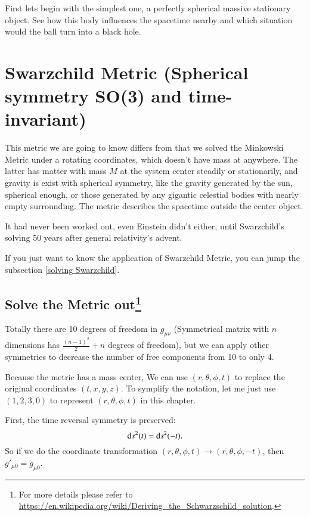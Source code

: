 \documentclass[openany,10pt]{book}
\theoremstyle{definition}
\theoremstyle{definition}
\theoremstyle{remark}
\begin{document}
First lets begin with the simplest one, a perfectly spherical massive stationary object. See how this body influences the spacetime nearby and which situation would the ball turn into a black hole.

\section{Swarzchild Metric (Spherical symmetry SO(3) and time-invariant)}

This metric we are going to know differs from that we solved the Minkowski Metric under a rotating coordinates, which doesn't have mass at anywhere. The latter has matter with mass $M$ at the system center steadily or stationarily, and gravity is exist with spherical symmetry, like the gravity generated by the sun, spherical enough, or those generated by any gigantic celestial bodies with nearly empty surrounding. The metric describes the spacetime outside the center object. 

It had never been worked out, even Einstein didn't either, until Swarzchild's solving 50 years after general relativity's advent.

If you just want to know the application of  Swarzchild Metric, you can jump the subsection \ref{solving  Swarzchild}.

\subsection[Solve the Metric out]{Solve the Metric out\footnote{For more details please refer to \url{https://en.wikipedia.org/wiki/Deriving_the_Schwarzschild_solution}.}}\label{solving Swarzchild}
Totally there are 10 degrees of freedom in $g_{\mu\nu}$ (Symmetrical matrix with $n$ dimensions has  $\frac{(n-1)^2}{2}+n$ degrees of freedom), but we can apply other symmetries to decrease the number of free components from 10 to only 4.

Because the metric has a mass center, We can use $(r,\theta,\phi,t)$ to replace the original coordinates $(t,x,y,z)$. To symplify the notation, let me just use $(1,2,3,0)$ to represent $(r,\theta,\phi,t)$ in this chapter.



First, the time reversal symmetry is preserved:
\begin{equation}
    {\rm d}s^2(t)={\rm d}s^2(-t).
\end{equation}
So if we do the coordinate transformation $(r,\theta,\phi,t) \longrightarrow (r,\theta,\phi,-t)$, then $g'_{\mu0}=g_{\mu0}$. %
\end{document}
